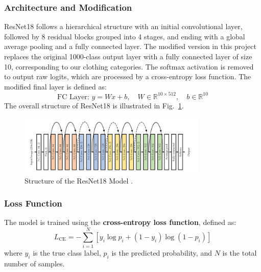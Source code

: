 \documentclass[12pt]{article}
\begin{document}
           \subsubsection{Architecture and Modification}  
            ResNet18 follows a hierarchical structure with an initial convolutional layer, followed by 8 residual blocks grouped into 4 stages, and ending with a global average pooling and a fully connected layer. The modified version in this project replaces the original 1000-class output layer with a fully connected layer of size 10, corresponding to our clothing categories. The softmax activation is removed to output raw logits, which are processed by a cross-entropy loss function. The modified final layer is defined as:
            \begin{equation*}
                \text{FC Layer: } y = Wx + b, \quad W \in \mathbb{R}^{10 \times 512}, \quad b \in \mathbb{R}^{10}
            \end{equation*}
            The overall structure of ResNet18 is illustrated in Fig.~\ref{fig:resnet18}.
            \begin{figure}[h]
                \centering
                \includegraphics[width=0.8\textwidth]{resnet18_structure.png}
                \caption{Structure of the ResNet18 Model \cite{resnet18_figure}.} 
                \label{fig:resnet18}
            \end{figure}
    
            \subsubsection{Loss Function}  
            The model is trained using the \textbf{cross-entropy loss function}, defined as:
            \begin{equation*}
                L_{\text{CE}} = - \sum_{i=1}^{N} \left[ y_i \log p_i + (1 - y_i) \log (1 - p_i) \right]
            \end{equation*}
            where \( y_i \) is the true class label, \( p_i \) is the predicted probability, and \( N \) is the total number of samples.    
    
\end{document}
